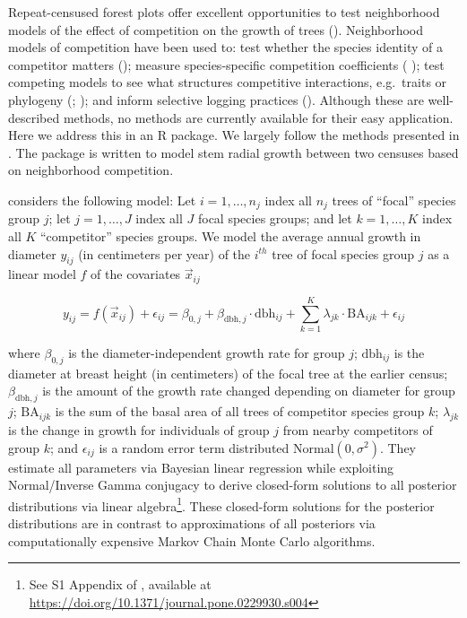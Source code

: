 \documentclass[12pt]{article}
\begin{document}
Repeat-censused forest plots offer excellent opportunities to test
neighborhood models of the effect of competition on the growth of trees
(\citet{canham_neighborhood_2004}). Neighborhood models of competition
have been used to: test whether the species identity of a competitor
matters (\citet{uriarte_spatially_2004}); measure species-specific
competition coefficients (\citet{das_effect_2012}
\citet{tatsumi_estimating_2016}); test competing models to see what
structures competitive interactions, e.g.~traits or phylogeny
(\citet{allen_permutation_2020}; \citet{uriarte_trait_2010}); and inform
selective logging practices (\citet{canham_neighborhood_2006}). Although
these are well-described methods, no methods are currently available for
their easy application. Here we address this in an R package. We largely
follow the methods presented in \citet{allen_permutation_2020}. The
package is written to model stem radial growth between two censuses
based on neighborhood competition.

\citet{allen_permutation_2020} considers the following model: Let
\(i = 1, \ldots, n_j\) index all \(n_j\) trees of ``focal'' species
group \(j\); let \(j = 1, \ldots, J\) index all \(J\) focal species
groups; and let \(k = 1, \ldots, K\) index all \(K\) ``competitor''
species groups. We model the average annual growth in diameter
\(y_{ij}\) (in centimeters per year) of the \(i^{th}\) tree of focal
species group \(j\) as a linear model \(f\) of the covariates
\(\vec{x}_{ij}\)

\begin{equation}
\label{eq:model}
y_{ij} = f(\vec{x}_{ij}) + \epsilon_{ij} = \beta_{0,j} + \beta_{\text{dbh},j} \cdot \text{dbh}_{ij} + \sum_{k=1}^{K} \lambda_{jk} \cdot \text{BA}_{ijk} + \epsilon_{ij}
\end{equation}

where \(\beta_{0,j}\) is the diameter-independent growth rate for group
\(j\); \(\text{dbh}_{ij}\) is the diameter at breast height (in
centimeters) of the focal tree at the earlier census;
\(\beta_{\text{dbh},j}\) is the amount of the growth rate changed
depending on diameter for group \(j\); \(\text{BA}_{ijk}\) is the sum of
the basal area of all trees of competitor species group \(k\);
\(\lambda_{jk}\) is the change in growth for individuals of group \(j\)
from nearby competitors of group \(k\); and \(\epsilon_{ij}\) is a
random error term distributed \(\text{Normal}(0, \sigma^2)\). They
estimate all parameters via Bayesian linear regression while exploiting
Normal/Inverse Gamma conjugacy to derive closed-form solutions to all
posterior distributions via linear algebra\footnote{See S1 Appendix of
  \citet{allen_permutation_2020}, available at
  \url{https://doi.org/10.1371/journal.pone.0229930.s004}}. These
closed-form solutions for the posterior distributions are in contrast to
approximations of all posteriors via computationally expensive Markov
Chain Monte Carlo algorithms.
\end{document}
